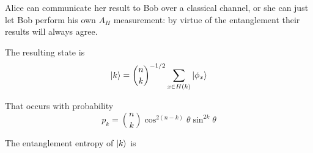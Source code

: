 Alice can communicate her result to Bob over a classical channel, or she can just let Bob perform his own $A_H$ measurement: by virtue of the entanglement their results will always agree.

The resulting state is
$$
\ket{k} = \binom{n}{k}^{-1/2} \sum_{x \in H(k)} \ket{\phi_x}
$$

That occurs with probability
$$
p_k = \binom{n}{k} \cos^{2(n-k)}\theta \sin^{2k}\theta
$$

The entanglement entropy of $\ket{k}$ is 
